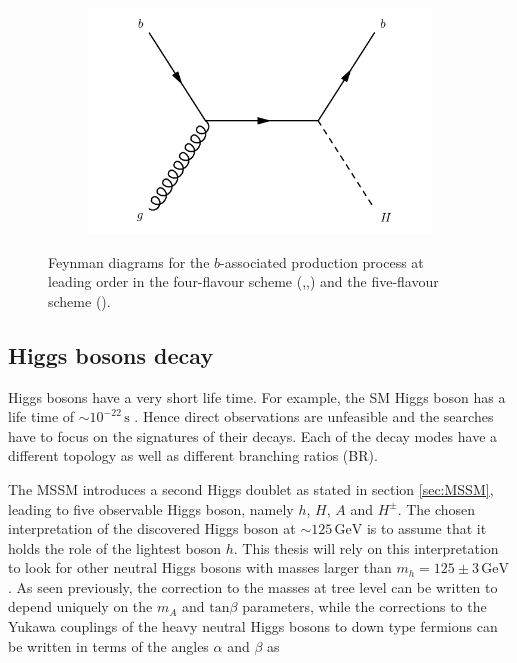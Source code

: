 \begin{figure}
\begin{subfigure}[b]{0.22\textwidth}
  \caption{\label{fig:bbh3}}
\end{subfigure}
\begin{subfigure}[b]{0.22\textwidth}
  \centering
  \includegraphics[width=\textwidth]{Images/bbh4.pdf}
  \caption{\label{fig:bbh4}}
\end{subfigure}%
\caption{Feynman diagrams for the $b$-associated production process at leading order in the four-flavour scheme (,,) and the five-flavour scheme ().}
\label{fig:bbh}
\end{figure}

\subsection{Higgs bosons decay}

Higgs bosons have a very short life time. For example, the SM Higgs boson has a life time of $\sim 10^{-22} \, \mathrm{s}$ \cite{pdg2016}. Hence direct observations are unfeasible and the searches have to focus on the signatures of their decays. Each of the decay modes have a different topology as well as different branching ratios (BR). 

The MSSM introduces a second Higgs doublet as stated in section \ref{sec:MSSM}, leading to five observable Higgs boson, namely $h$, $H$, $A$ and $H^{\pm}$. The chosen interpretation of the discovered Higgs boson at $\sim 125\, \mathrm{GeV}$ is to assume that it holds the role of the lightest boson $h$. This thesis will rely on this interpretation to look for other neutral Higgs bosons with masses larger than $m_h = 125 \pm 3 \, \mathrm{GeV}$. As seen previously, the correction to the masses at tree level can be written to depend uniquely on the $m_A$ and $\mathrm{tan} \beta$ parameters, while the corrections to the Yukawa couplings of the heavy neutral Higgs bosons to down type fermions can be written in terms of the angles $\alpha$ and $\beta$ as

